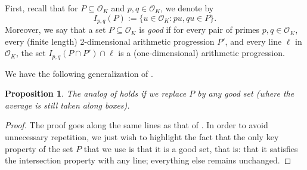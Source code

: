 \documentclass[11pt]{amsart}
\newtheorem{proposition}[lemma]{Proposition}
\theoremstyle{definition}
\newcommand{\WS}[1]{{\color{blue}{{#1}}}}
\begin{document}
First, recall that for $P\subseteq \mathcal{O}_{K}$ and $p,q\in\mathcal{O}_{K}$, we denote by 
$$I_{p,q}(P):=\{u\in \mathcal{O}_{K}\colon pu,qu\in P\}.$$
Moreover, we say that a set $P\subseteq \mathcal{O}_{K}$ is \emph{good} if for every pair of primes $p,q\in\mathcal{O}_{K}$, every (finite length) 2-dimensional arithmetic progression $P'$, and every line $\ell$ in $\mathcal{O}_{K}$, the set $I_{p,q}(P\cap P')\cap \ell$ is a (one-dimensional) arithmetic progression.
 
We have the following generalization of \cite[Theorem~7.1]{S23}. 
\begin{proposition}\label{7.1s2}
    The analog of \cite[Theorem~7.1]{S23} holds if we replace $P$ by any good set (where the average is still taken along boxes).
\end{proposition}
\begin{proof}
The proof goes along the same lines as that of \cite[Theorem~7.1]{S23}. In order to avoid unnecessary repetition, we just wish to highlight the fact that the only key property of the set $P$ that we use is that it is a good set, that is: that it satisfies the intersection property with any line; everything else remains unchanged.    
\end{proof}
\end{document}

